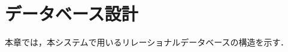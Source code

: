 \documentclass[../main]{subfiles}
\begin{document}
\section{データベース設計}

本章では，本システムで用いるリレーショナルデータベースの構造を示す．




 









\end{document}
